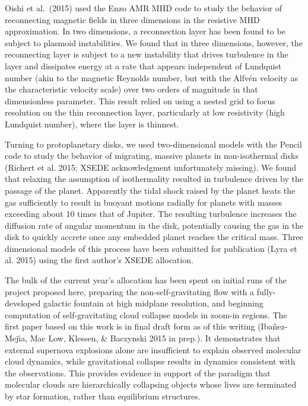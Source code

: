 \documentclass[12pt,preprint]{aastex}
\begin{document}
Oishi et al.\ (2015)  used the Enzo AMR MHD code to study the behavior of reconnecting magnetic fields in three dimensions in the resistive MHD approximation. In two dimensions, a reconnection layer has been found to be subject to plasmoid instabilities. We found that in three dimensions, however, the reconnecting layer is subject to a new instability that drives turbulence in the layer and dissipates energy at a rate that appears independent of Lundquist number (akin to the magnetic Reynolds number, but with the Alfv\'en velocity as the characteristic velocity scale) over two orders of magnitude in that dimensionless parameter.  This result relied on using a nested grid to focus resolution on the thin reconnection layer, particularly at low resistivity (high Lundquist number), where the layer is thinnest.

Turning to protoplanetary disks, we used two-dimensional models with the Pencil code to study the behavior of migrating, massive planets in non-isothermal disks (Richert et al. 2015; XSEDE acknowledgment unfortunately missing).  We found that relaxing the assumption of isothermality resulted in turbulence driven by the passage of the planet. Apparently the tidal shock raised by the planet heats the gas sufficiently to result in buoyant motions radially for planets with masses exceeding about 10 times that of Jupiter.  The resulting turbulence increases the diffusion rate of angular momentum in the disk, potentially causing the gas in the disk to quickly accrete once any embedded planet reaches the critical mass.  Three dimensional models of this process have been submitted for publication (Lyra et al. 2015) using the first author's XSEDE allocation.

The bulk of the current year's allocation has been spent on initial runs of the project proposed here, preparing the non-self-gravitating flow with a fully-developed galactic fountain at high midplane resolution, and beginning computation of self-gravitating cloud collapse models in zoom-in regions.  The first paper based on this work is in final draft form as of this writing (Iba\~nez-Mej\'{\i}a, Mac Low, Klessen, \& Baczynski 2015 in prep.). It demonstrates that external supernova explosions alone are insufficient to explain observed molecular cloud dynamics, while gravitational collapse results in dynamics consistent with the observations. This provides evidence in support of the paradigm that molecular clouds are hierarchically collapsing objects whose lives are terminated by star formation, rather than equilibrium structures.
\end{document}
